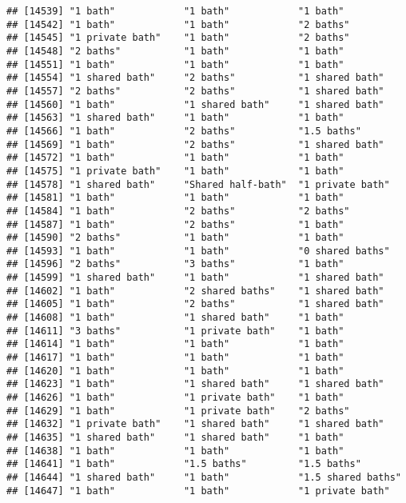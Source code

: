 \documentclass[
]{article}
\begin{document}
\begin{verbatim}
## [14539] "1 bath"            "1 bath"            "1 bath"           
## [14542] "1 bath"            "1 bath"            "2 baths"          
## [14545] "1 private bath"    "1 bath"            "2 baths"          
## [14548] "2 baths"           "1 bath"            "1 bath"           
## [14551] "1 bath"            "1 bath"            "1 bath"           
## [14554] "1 shared bath"     "2 baths"           "1 shared bath"    
## [14557] "2 baths"           "2 baths"           "1 shared bath"    
## [14560] "1 bath"            "1 shared bath"     "1 shared bath"    
## [14563] "1 shared bath"     "1 bath"            "1 bath"           
## [14566] "1 bath"            "2 baths"           "1.5 baths"        
## [14569] "1 bath"            "2 baths"           "1 shared bath"    
## [14572] "1 bath"            "1 bath"            "1 bath"           
## [14575] "1 private bath"    "1 bath"            "1 bath"           
## [14578] "1 shared bath"     "Shared half-bath"  "1 private bath"   
## [14581] "1 bath"            "1 bath"            "1 bath"           
## [14584] "1 bath"            "2 baths"           "2 baths"          
## [14587] "1 bath"            "2 baths"           "1 bath"           
## [14590] "2 baths"           "1 bath"            "1 bath"           
## [14593] "1 bath"            "1 bath"            "0 shared baths"   
## [14596] "2 baths"           "3 baths"           "1 bath"           
## [14599] "1 shared bath"     "1 bath"            "1 shared bath"    
## [14602] "1 bath"            "2 shared baths"    "1 shared bath"    
## [14605] "1 bath"            "2 baths"           "1 shared bath"    
## [14608] "1 bath"            "1 shared bath"     "1 bath"           
## [14611] "3 baths"           "1 private bath"    "1 bath"           
## [14614] "1 bath"            "1 bath"            "1 bath"           
## [14617] "1 bath"            "1 bath"            "1 bath"           
## [14620] "1 bath"            "1 bath"            "1 bath"           
## [14623] "1 bath"            "1 shared bath"     "1 shared bath"    
## [14626] "1 bath"            "1 private bath"    "1 bath"           
## [14629] "1 bath"            "1 private bath"    "2 baths"          
## [14632] "1 private bath"    "1 shared bath"     "1 shared bath"    
## [14635] "1 shared bath"     "1 shared bath"     "1 bath"           
## [14638] "1 bath"            "1 bath"            "1 bath"           
## [14641] "1 bath"            "1.5 baths"         "1.5 baths"        
## [14644] "1 shared bath"     "1 bath"            "1.5 shared baths" 
## [14647] "1 bath"            "1 bath"            "1 private bath"   

\end{verbatim}
\end{document}
